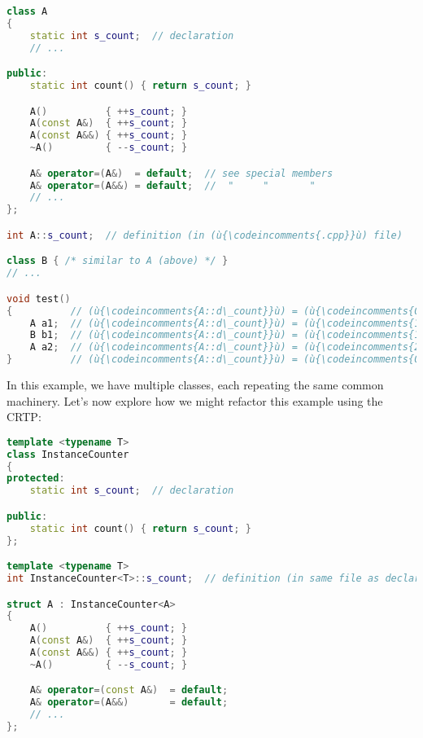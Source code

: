 \begin{lstlisting}[language=C++]
class A
{
    static int s_count;  // declaration
    // ...

public:
    static int count() { return s_count; }

    A()          { ++s_count; }
    A(const A&)  { ++s_count; }
    A(const A&&) { ++s_count; }
    ~A()         { --s_count; }

    A& operator=(A&)  = default;  // see special members
    A& operator=(A&&) = default;  //  "     "       "
    // ...
};

int A::s_count;  // definition (in (ù{\codeincomments{.cpp}}ù) file)

class B { /* similar to A (above) */ }
// ...

void test()
{          // (ù{\codeincomments{A::d\_count}}ù) = (ù{\codeincomments{0}}ù), (ù{\codeincomments{B::d\_count}}ù) = (ù{\codeincomments{0}}ù)
    A a1;  // (ù{\codeincomments{A::d\_count}}ù) = (ù{\codeincomments{1}}ù), (ù{\codeincomments{B::d\_count}}ù) = (ù{\codeincomments{0}}ù)
    B b1;  // (ù{\codeincomments{A::d\_count}}ù) = (ù{\codeincomments{1}}ù), (ù{\codeincomments{B::d\_count}}ù) = (ù{\codeincomments{1}}ù)
    A a2;  // (ù{\codeincomments{A::d\_count}}ù) = (ù{\codeincomments{2}}ù), (ù{\codeincomments{B::d\_count}}ù) = (ù{\codeincomments{1}}ù)
}          // (ù{\codeincomments{A::d\_count}}ù) = (ù{\codeincomments{0}}ù), (ù{\codeincomments{B::d\_count}}ù) = (ù{\codeincomments{0}}ù)
\end{lstlisting}
    
\noindent In this example, we have multiple classes, each repeating the same
common machinery. Let's now explore how we might refactor this example
using the CRTP:

\begin{lstlisting}[language=C++]
template <typename T>
class InstanceCounter
{
protected:
    static int s_count;  // declaration

public:
    static int count() { return s_count; }
};

template <typename T>
int InstanceCounter<T>::s_count;  // definition (in same file as declaration)

struct A : InstanceCounter<A>
{
    A()          { ++s_count; }
    A(const A&)  { ++s_count; }
    A(const A&&) { ++s_count; }
    ~A()         { --s_count; }

    A& operator=(const A&)  = default;
    A& operator=(A&&)       = default;
    // ...
};
\end{lstlisting}
    
